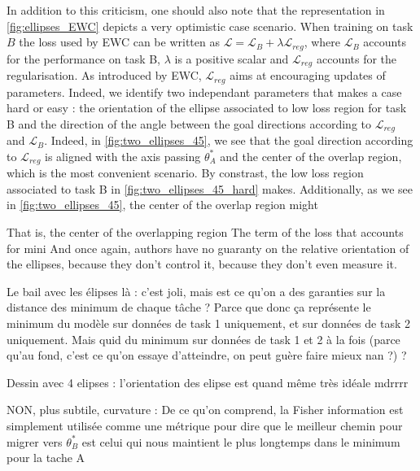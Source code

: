 \documentclass[twocolumn]{article}
\begin{document}
\vspace{1mm}
\noindent
In addition to this criticism, one should also note that the representation in \ref{fig:ellipses_EWC} depicts a very optimistic case scenario. When training on task $B$ the loss used by EWC can be written as $\mathcal{L} = \mathcal{L}_{B} + \lambda\mathcal{L}_{reg}$, where $\mathcal{L}_{B}$ accounts for the performance on task B, $\lambda$ is a positive scalar and $\mathcal{L}_{reg}$ accounts for the regularisation. As introduced by EWC, $\mathcal{L}_{reg}$ aims at encouraging updates of parameters. Indeed, we identify two independant parameters that makes a case hard or easy : the orientation of the ellipse associated to low loss region for task B and the direction of the angle between the goal directions according to $\mathcal{L}_{reg}$ and $\mathcal{L}_B$. Indeed, in \ref{fig:two_ellipses_45}, we see that the goal direction according to $\mathcal{L}_{reg}$ is aligned with the axis passing $\theta_A^*$ and the center of the overlap region, which is the most convenient scenario. By constrast, the low loss region associated to task B in \ref{fig:two_ellipses_45_hard} makes. Additionally, as we see in \ref{fig:two_ellipses_45}, the center of the overlap region might

That is, the center of the overlapping region
The term of the loss that accounts for mini
And once again, authors have no guaranty on the relative orientation of the ellipses, because they don't control it, because they don't even measure it.


\vspace{1mm}
\noindent
Le bail avec les élipses là : c'est joli, mais est ce qu'on a des garanties sur la distance des minimum de chaque tâche ? 
Parce que donc ça représente le minimum du modèle sur données de task 1 uniquement, et sur données de task 2 uniquement. Mais quid du minimum sur données de task 1 et 2 à la fois (parce qu'au fond, c'est ce qu'on essaye d'atteindre, on peut guère faire mieux nan ?) ?

\vspace{1mm}
\noindent
Dessin avec 4 elipses : l'orientation des elipse est quand même très idéale mdrrrr

\vspace{1mm}
\noindent
NON, plus subtile, curvature :
De ce qu'on comprend, la Fisher information est simplement utilisée comme une métrique pour dire que le meilleur chemin pour migrer vers $\theta_B^*$ est celui qui nous maintient le plus longtemps dans le minimum pour la tache A
\end{document}
